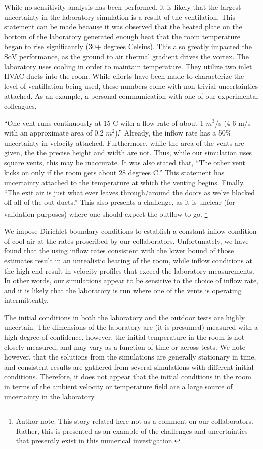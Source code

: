 \documentclass{article}
\begin{document}
While no sensitivity analysis has been performed, it is likely that the
largest uncertainty in the laboratory simulation is a result of the
ventilation. This statement can be made because it was observed that the
heated plate on the bottom of the laboratory generated enough heat that
the room temperature began to rise significantly (30+ degrees
Celsius). This also greatly impacted the SoV performance, as the ground
to air thermal gradient drives the vortex. The laboratory uses cooling
in order to maintain temperature. They utilize two inlet HVAC ducts into
the room. While efforts have been made to characterize the level of
ventillation being used, these numbers come with non-trivial
uncertainties attached. As an example, a personal communication with one
of our experimental colleagues, 

``One vent runs continuously at 15 C with a flow rate of about 1
$m^3$/s (4-6 m/s with an approximate area of 0.2 $m^2$).''
Already, the inflow rate has a 50\% uncertainty in velocity
attached. Furthermore, while the area of the vents are given, the the
precise height and width are not. Thus, while our simulation uses square
vents, this may be inaccurate. 
It was also stated that, ``The other vent kicks on only if the
room gets about 28 degrees C.'' This statement has uncertainty attached to the
temperature at which the venting begins. Finally, ``The exit air is just
what ever leaves through/around the doors as we've blocked off all of
the out ducts.'' This also presents a challenge, as it is unclear (for
validation purposes) where one should expect the outflow to
go. \footnote{\normalsize Author note: This story related here not as a comment on
our collaborators. Rather, this is presented as an example of the challenges
and uncertainties that presently exist in this numerical investigation.}

We impose Dirichlet boundary conditions to establish a constant inflow
condition of cool air at the rates proscribed by our
collaborators. Unfortunately, we have found that the using inflow rates
consistent with the lower bound of those estimates result in an
unrealistic heating of the room, while inflow conditions at the high end
result in velocity profiles that exceed the laboratory measurements. In
other words, our simulations appear to be sensitive to the choice of
inflow rate, and it is likely that the laboratory is run where one of
the vents is operating intermittently. 

The initial conditions in both the laboratory and the outdoor
tests are highly uncertain. The dimensions of the laboratory are
(it is presumed) measured with a high degree of confidence, however, the
initial temperature 
in the room is not closely measured, and may vary as a function of
time or across tests. We note however, that the solutions from the simulations are
generally stationary in time, and consistent results are gathered from several
simulations with different initial conditions. Therefore, it does not
appear that the initial conditions in the room in terms of the ambient
velocity or temperature field are a large source of uncertainty in the
laboratory.
\end{document}
